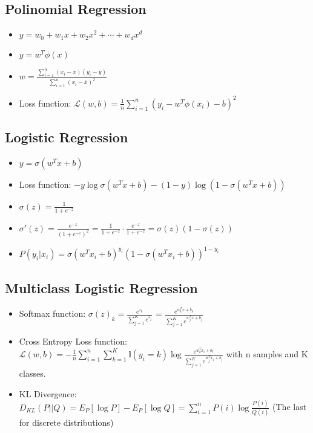 \documentclass[a4paper,7pt]{extarticle}
\theoremstyle{definition}
\begin{document}
\begin{multicols*}{2}
\subsection{Polinomial Regression}

\begin{itemize}
\item $y = w_0 + w_1 x + w_2 x^2 + \cdots + w_d x^d$
\item $y = w^T \phi(x)$
\item $w = \frac{\sum_{i=1}^n (x_i - \bar{x}) (y_i - \bar{y})}{\sum_{i=1}^n (x_i - \bar{x})^2}$
\item Loss function: $\mathcal{L}(w, b) = \frac{1}{n} \sum_{i=1}^n (y_i - w^T \phi(x_i) - b)^2$
\end{itemize}

\subsection{Logistic Regression}

\begin{itemize}
\item $y = \sigma(w^T x + b)$
\item Loss function: $-y \log \sigma(w^T x + b) - (1 - y) \log (1 - \sigma(w^T x + b))$
\item $\sigma(z) = \frac{1}{1 + e^{-z}}$
\item $\sigma'(z) = \frac{e^{-z}}{(1 + e^{-z})^2} = \frac{1}{1 + e^{-z}} \cdot \frac{e^{-z}}{1 + e^{-z}} = \sigma(z) (1 - \sigma(z))$
\item $P(y_i|x_i) = \sigma(w^T x_i + b)^{y_i} (1 - \sigma(w^T x_i + b))^{1 - y_i}$

\end{itemize}

\subsection{Multiclass Logistic Regression}

\begin{itemize}
\item Softmax function: $\sigma(z)_k = \frac{e^{z_k}}{\sum_{j=1}^K e^{z_j}}$ =  $\frac{e^{w_k^T x + b_k}}{\sum_{j=1}^K e^{w_j^T x + b_j}}$
\item Cross Entropy Loss  function: $\mathcal{L}(w, b) = - \frac{1}{n} \sum_{i=1}^n \sum_{k=1}^K \mathbb{I}(y_i = k) \log \frac{e^{w_k^T x_i + b_k}}{\sum_{j=1}^K e^{w_j^T x_i + b_j}}$ with n samples and K classes.
\item KL Divergence:  $D_{KL}(P||Q) = E_{P}\left[\log P\right] - E_{P}\left[\log Q\right] = \sum_{i=1}^n P(i) \log \frac{P(i)}{Q(i)}$ (The last for discrete distributions)
\end{itemize}


\end{multicols*}
\end{document}
